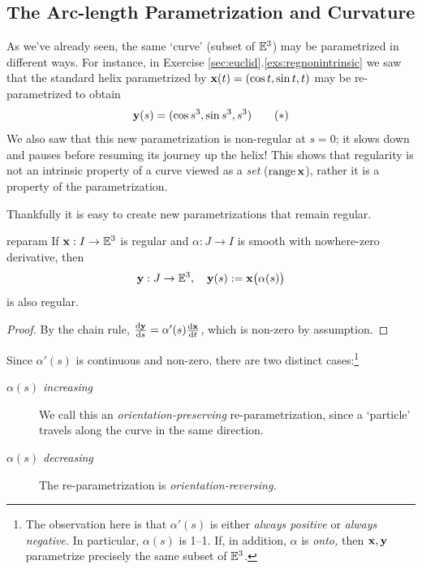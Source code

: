 \clearpage


\subsection{The Arc-length Parametrization and Curvature}\label{sec:arclength}

As we've already seen, the same `curve' (subset of $\E^3$) may be parametrized in different ways. For instance, in Exercise \ref*{sec:euclid}.\ref{exs:regnonintrinsic} we saw that the standard helix parametrized by $\vx(t)=(\cos t,\sin t,t)$ may be re-parametrized to obtain
\[\vy(s)=(\cos s^3,\sin s^3,s^3)\tag{$\ast$}\]
We also saw that this new parametrization is non-regular at $s=0$; it slows down and pauses before resuming its journey up the helix! This shows that regularity is not an intrinsic property of a curve viewed as a \emph{set} ($\operatorname{range}\vx$), rather it is a property of the parametrization.\smallbreak

Thankfully it is easy to create new parametrizations that remain regular.

\begin{lemm}{}{reparam}
If $\vx:I\to\E^3$ is regular and $\alpha:J\to I$ is smooth with nowhere-zero derivative, then
\[\vy:J\to\E^3,\quad \vy(s):=\vx\bigl(\alpha(s)\bigr)\]
is also regular.
\end{lemm}

\begin{proof}\def\range{\operatorname{range}}
By the chain rule, $\diff[\vy]{s}=\alpha'(s)\diff[\vx]{t}$, which is non-zero by assumption.%
\end{proof}


Since $\alpha'(s)$ is continuous and non-zero, there are two distinct cases:\footnote{The observation here is that $\alpha'(s)$ is either \emph{always positive} or \emph{always negative.} In particular, $\alpha(s)$ is 1--1. If, in addition, $\alpha$ is \emph{onto,} then $\vx,\vy$ parametrize precisely the same subset of $\E^3$.}
\begin{description}
	\item[\normalfont\emph{$\alpha(s)$ increasing}] We call this an \emph{orientation-preserving} re-parametrization, since a `particle' travels along the curve in the same direction.
	\item[\normalfont\emph{$\alpha(s)$ decreasing}] The re-parametrization is \emph{orientation-reversing.}
\end{description}



